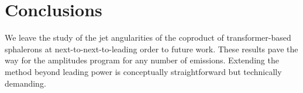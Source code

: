 \section{Conclusions}\label{sec:conclusions}

We leave the study of the jet angularities of the coproduct of
transformer-based sphalerons at next-to-next-to-leading order to future
work. These results pave the way for the amplitudes program for any
number of emissions. Extending the method beyond leading power is
conceptually straightforward but technically demanding.

